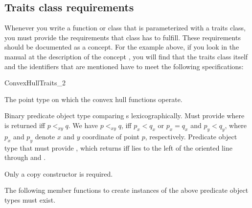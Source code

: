 \subsection{Traits class requirements\label{subsec:traits_class_requirements}}

Whenever you write a function or class that is  parameterized with a traits
class, you must provide the requirements that class has to fulfill. These
requirements should be documented as a concept.  For the
example above, if you look in the manual at the description of the concept
, you will find  that the
traits class itself and the identifiers that are mentioned have to meet the 
following specifications:

\begin{ccRefConcept}{ConvexHullTraits_2}
\ccTypes
\ccAutoIndexingOff
{}

%
       {The point type on which the convex hull functions operate.}

%
       {Binary predicate object type comparing s
        lexicographically.  Must provide
         where 
        is returned iff $p <_{xy} q$.
        We have $p<_{xy}q$, iff $p_x < q_x$ or $p_x = q_x$ and $p_y < q_y$,
        where $p_x$ and $p_y$ denote $x$ and $y$ coordinate of point $p$,
        respectively.
       }
%
       {Predicate object type that must provide
        , which
        returns  iff  lies to the left of the
        oriented line through  and .}
\ccCreation
{}  %

Only a copy constructor is required.


\ccOperations
The following member functions to create instances of the above predicate
object types must exist.

\setlength\parskip{0mm}
\ccGlue
{}

\end{ccRefConcept}
\ccAutoIndexingOn

